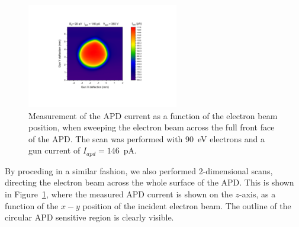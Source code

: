 \documentclass[12p]{paper}
\begin{document}
\begin{figure}[p]
  \centering
\includegraphics[width=0.59\textwidth]{figures/APD_scan_V350_E90}
 \caption{Measurement of the APD current as a function of the electron beam position, when sweeping the electron beam across the full front face of the APD. The scan was performed with 90~eV electrons and a gun current of $I_{apd} = 146$~pA.
  \label{fig:2d_scan}}
\end{figure}

By proceding in a similar fashion, we also performed 2-dimensional scans, directing the electron beam across the whole surface of the APD. This is shown in Figure~\ref{fig:2d_scan}, where the measured APD current is shown on the $z$-axis, as a function of the $x-y$ position of the incident electron beam. The outline of the circular APD sensitive region is clearly visible.


\clearpage
\end{document}
